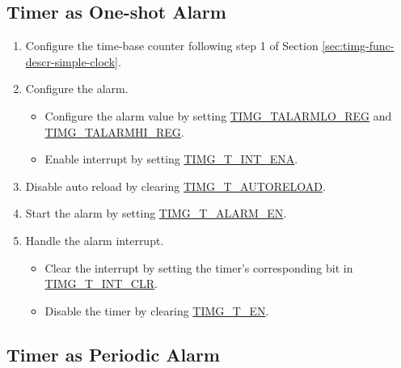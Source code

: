 \documentclass[main\_\_EN.tex]{subfiles}
\begin{document}
\subsection{Timer as One-shot Alarm}\label{sec:timg-func-descr-timer-alarm}
\begin{enumerate}
    \item Configure the time-base counter following step 1 of Section \ref{sec:timg-func-descr-simple-clock}.
    \item Configure the alarm.
    \begin{itemize}
        \item Configure the alarm value by setting \hyperref[regdesc:TIMGTXALARMLOREG]{TIMG\_TALARMLO\_REG} and \hyperref[regdesc:TIMGTXALARMHIREG]{TIMG\_TALARMHI\_REG}.
        \item Enable interrupt by setting  \hyperref[fielddesc:TIMGTXINTENA]{TIMG\_T\_INT\_ENA}.
    \end{itemize}
    \item Disable auto reload by clearing \hyperref[fielddesc:TIMGTXAUTORELOAD]{TIMG\_T\_AUTORELOAD}.
    \item Start the alarm by setting \hyperref[fielddesc:TIMGTXALARMEN]{TIMG\_T\_ALARM\_EN}.
    \item Handle the alarm interrupt.
    \begin{itemize}
        \item Clear the interrupt by setting the timer's corresponding bit in \hyperref[fielddesc:TIMGTXINTCLR]{TIMG\_T\_INT\_CLR}.
        \item Disable the timer by clearing \hyperref[fielddesc:TIMGTXEN]{TIMG\_T\_EN}.
    \end{itemize}
\end{enumerate}

\subsection{Timer as Periodic Alarm}
\end{document}
